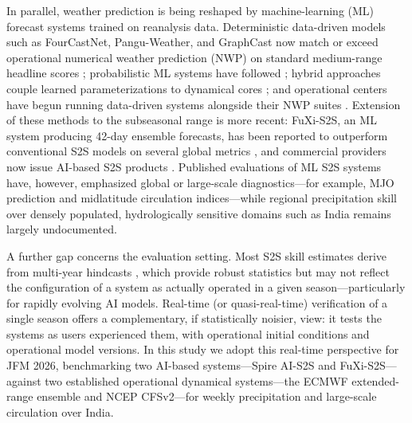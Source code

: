 \documentclass[11pt]{article}
\begin{document}
In parallel, weather prediction is being reshaped by machine-learning
(ML) forecast systems trained on reanalysis data. Deterministic
data-driven models such as FourCastNet, Pangu-Weather, and GraphCast
now match or exceed operational numerical weather prediction (NWP) on
standard medium-range headline scores
\citep{pathak2022,bi2023,lam2023,benbouallegue2024,rasp2024};
probabilistic ML systems have followed \citep{price2025}; hybrid
approaches couple learned parameterizations to dynamical cores
\citep{kochkov2024}; and operational centers have begun running
data-driven systems alongside their NWP suites \citep{lang2024}.
Extension of these methods to the subseasonal range is more recent:
FuXi-S2S, an ML system producing 42-day ensemble forecasts, has been
reported to outperform conventional S2S models on several global
metrics \citep{chen2024}, and commercial providers now issue AI-based
S2S products \citep{spire2026}. Published evaluations of ML S2S
systems have, however, emphasized global or large-scale
diagnostics---for example, MJO prediction and midlatitude circulation
indices---while regional precipitation skill over densely populated,
hydrologically sensitive domains such as India remains largely
undocumented.

A further gap concerns the evaluation setting. Most S2S skill
estimates derive from multi-year hindcasts
\citep{deandrade2019,pegion2019}, which provide robust statistics but
may not reflect the configuration of a system as actually operated in a
given season---particularly for rapidly evolving AI models. Real-time
(or quasi-real-time) verification of a single season offers a
complementary, if statistically noisier, view: it tests the systems as
users experienced them, with operational initial conditions and
operational model versions. In this study we adopt this real-time
perspective for JFM 2026, benchmarking two AI-based systems---Spire
AI-S2S and FuXi-S2S---against two established operational dynamical
systems---the ECMWF extended-range ensemble and NCEP CFSv2---for weekly
precipitation and large-scale circulation over India.
\end{document}
